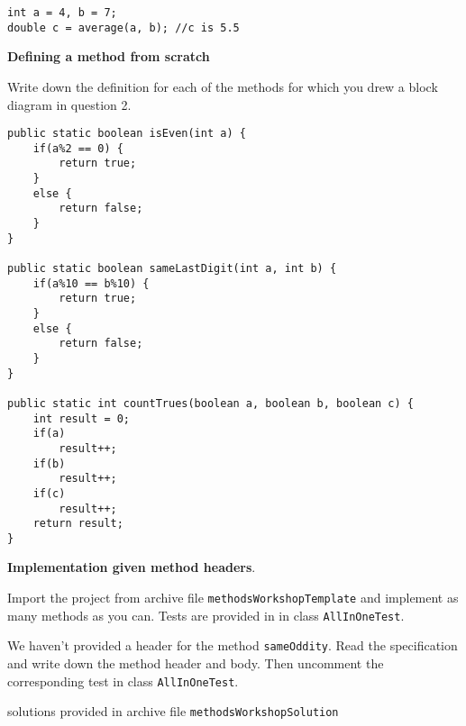 \begin{questions}
\begin{parts}
\ifprintanswers
\begin{lstlisting}
int a = 4, b = 7;
double c = average(a, b); //c is 5.5
\end{lstlisting}
\newpage
\else
\fi
\end{parts}

\question \textbf{Defining a method from scratch}

Write down the definition for each of the methods for which you drew a block diagram in question 2.

\ifprintanswers
\begin{lstlisting}
public static boolean isEven(int a) {
	if(a%2 == 0) {
		return true;
	}
	else {
		return false;
	}
}

public static boolean sameLastDigit(int a, int b) {
	if(a%10 == b%10) {
		return true;
	}
	else {
		return false;
	}
}

public static int countTrues(boolean a, boolean b, boolean c) {
	int result = 0;
	if(a)
		result++;
	if(b)
		result++;
	if(c)
		result++;
	return result;
}
\end{lstlisting}

\else
\fi

\question \textbf{Implementation given method headers}.

Import the project from archive file \texttt{methodsWorkshopTemplate} and implement as many methods as you can. Tests are provided in in class \texttt{AllInOneTest}. 

We haven't provided a header for the method \texttt{sameOddity}. Read the specification and write down the method header and body. Then uncomment the corresponding test in class \texttt{AllInOneTest}.
\end{questions}

\ifprintanswers
solutions provided in archive file
\texttt{methodsWorkshopSolution}
\else
\fi


